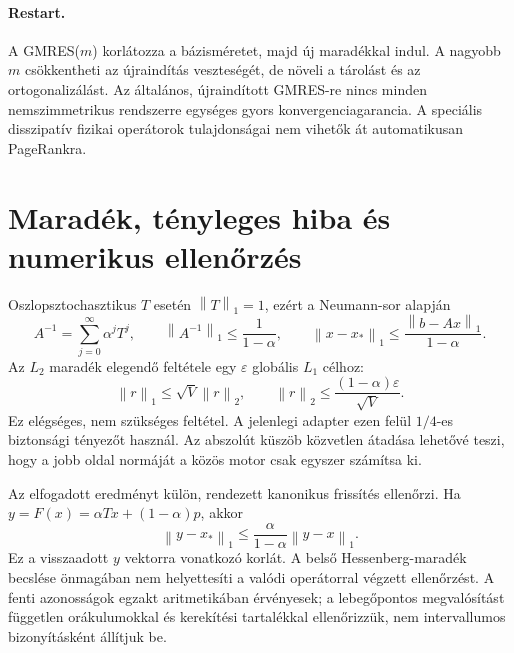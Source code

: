 \documentclass[11pt,a4paper]{article}
\newcommand{\norm}[1]{\left\lVert#1\right\rVert}
\begin{document}
\paragraph{Restart.} A GMRES($m$) korlátozza a bázisméretet, majd új maradékkal
indul. A nagyobb $m$ csökkentheti az újraindítás veszteségét, de növeli a tárolást
és az ortogonalizálást. Az általános, újraindított GMRES-re nincs minden
nemszimmetrikus rendszerre egységes gyors konvergenciagarancia. A speciális
disszipatív fizikai operátorok tulajdonságai nem vihetők át automatikusan PageRankra.

\newpage\section{Maradék, tényleges hiba és numerikus ellenőrzés}
Oszlopsztochasztikus $T$ esetén $\norm{T}_1=1$, ezért a Neumann-sor alapján
\[
 A^{-1}=\sum_{j=0}^{\infty}\alpha^j T^j,\qquad
 \norm{A^{-1}}_1\leq\frac1{1-\alpha},\qquad
 \norm{x-x_*}_1\leq\frac{\norm{b-Ax}_1}{1-\alpha}.
\]
Az $L_2$ maradék elegendő feltétele egy $\varepsilon$ globális $L_1$ célhoz:
\[
 \norm{r}_1\leq\sqrt V\norm{r}_2,\qquad
 \norm{r}_2\leq\frac{(1-\alpha)\varepsilon}{\sqrt V}.
\]
Ez elégséges, nem szükséges feltétel. A jelenlegi adapter ezen felül $1/4$-es
biztonsági tényezőt használ. Az abszolút küszöb közvetlen átadása lehetővé teszi,
hogy a jobb oldal normáját a közös motor csak egyszer számítsa ki.

Az elfogadott eredményt külön, rendezett kanonikus frissítés ellenőrzi. Ha
$y=F(x)=\alpha Tx+(1-\alpha)p$, akkor
\[
 \norm{y-x_*}_1\leq\frac{\alpha}{1-\alpha}\norm{y-x}_1.
\]
Ez a visszaadott $y$ vektorra vonatkozó korlát. A belső Hessenberg-maradék becslése
önmagában nem helyettesíti a valódi operátorral végzett ellenőrzést.
A fenti azonosságok egzakt aritmetikában érvényesek; a lebegőpontos megvalósítást
független orákulumokkal és kerekítési tartalékkal ellenőrizzük, nem intervallumos
bizonyításként állítjuk be.
\end{document}
